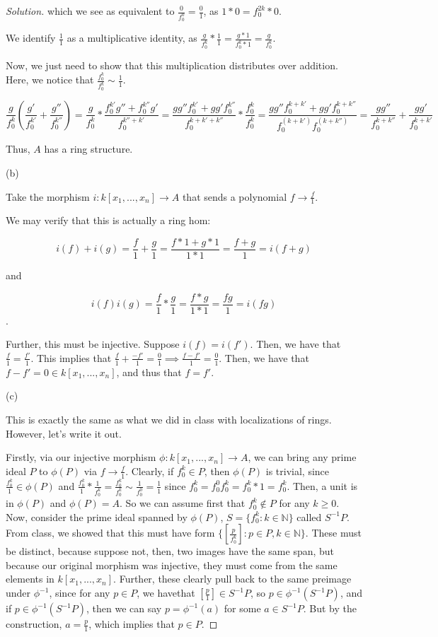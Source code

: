 \documentclass[10pt]{article}
\begin{document}
\begin{proof}[Solution]
which we see as equivalent to $\frac{0}{f_0^0} = \frac{0}{1}$, as $ 1 * 0 = f_0^{2k} * 0$.

We identify $\frac{1}{1}$ as a multiplicative identity, as $\frac{g}{f_0^k} * \frac{1}{1} = \frac{g*1}{f_0^k * 1} = \frac{g}{f_0^k}$.

Now, we just need to show that this multiplication distributes over addition. Here, we notice that $\frac{f_0^k}{f_0^k} \sim \frac{1}{1}$.

$$ \frac{g}{f_0^k} ( \frac{g'}{f_0^{k'}} + \frac{g''}{f_0^{k''}}) = \frac{g}{f_0^k} * \frac{f_0^{k'} g'' + f_0^{k''} g'}{f_0^{k'' + k'}} = \frac{gg''f_0^{k'} + gg'f_0^{k''}}{f_0^{k + k' + k''}}* \frac{f_0^k}{f_0^k} = \frac{gg''f_0^{k+k'} + gg'f_0^{k+k''}}{f_0^{(k + k')}f_0^{( k+ k'')}} =  \frac{gg''}{f_0^{k+k''}} +  \frac{gg'}{f_0^{k+k'}} $$

Thus, $A$ has a ring structure.

(b)

Take the morphism $i: k[x_1,...,x_n] \to A$ that sends a polynomial $f \to \frac{f}{1}$. 

We may verify that this is actually a ring hom: 

$$i(f) + i(g) = \frac{f}{1} + \frac{g}{1} = \frac{f*1 + g*1}{1*1} = \frac{f+g}{1} = i(f+g)$$

and

$$ i(f)i(g) = \frac{f}{1} * \frac{g}{1} = \frac{f*g}{1*1} = \frac{fg}{1} = i(fg)$$.

Further, this must be injective. Suppose $i(f) = i(f')$. Then, we have that $\frac{f}{1} = \frac{f'}{1}$. This implies that $\frac{f}{1} + \frac{-f'}{1} = \frac{0}{1} \implies \frac{f - f'}{1} = \frac{0}{1}$. Then, we have that $f - f' = 0 \in k[x_1,...,x_n]$, and thus that $f = f'$.

(c)

This is exactly the same as what we did in class with localizations of rings. However, let's write it out.

Firstly, via our injective morphism $ \phi: k[x_1,...,x_n] \to A$, we can bring any prime ideal $P$ to $\phi(P)$ via $f \to \frac{f}{1}$. Clearly, if $f_0^k \in P$, then $\phi(P)$ is trivial, since $\frac{f_0^k}{1} \in \phi(P)$ and $\frac{f_0^k}{1} * \frac{1}{f_0^k} = \frac{f_0^k}{f_0^k} \sim \frac{1}{f_0^0} = \frac{1}{1}$ since $f_0^k = f_0^0 f_0^k = f_0^k * 1  = f_0^k$. Then, a unit is in $\phi(P)$ and $\phi(P) = A$. So we can assume first that $f_0^k \not \in P$ for any $k \geq 0$. Now, consider the prime ideal spanned by $\phi(P)$, $S = \{ f_0^k : k \in \mathbb{N} \}$ called $S^{-1}P$. From class, we showed that this must have form $\{ [ \frac{p}{f_0^k} ] : p \in P, k \in \mathbb{N} \}$. These must be distinct, because suppose not, then, two images have the same span, but because our original morphism was injective, they must come from the same elements in $k[x_1,...,x_n]$. Further, these clearly pull back to the same preimage under $\phi^{-1}$, since for any $p \in P$, we havethat $[\frac{p}{1}] \in S^{-1}P$, so $p \in \phi^{-1}(S^{-1}P)$, and if $p \in \phi^{-1}(S^{-1}P)$, then we can say $p =  \phi^{-1}(a)$ for some $a \in S^{-1}P$. But by the construction, $a = \frac{p}{1}$, which implies that $p \in P$. 


\end{proof}
\end{document}
